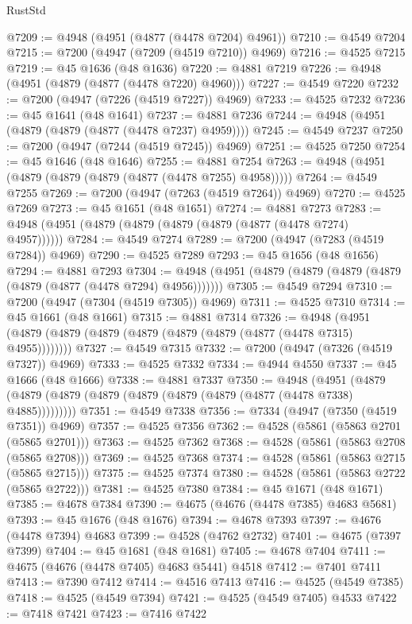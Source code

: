 \begin{lexlean}{RustStd}
\begin{coremodule}
@7209 := @4948 (@4951 (@4877 (@4478 @7204) @4961))
@7210 := @4549 @7204
@7215 := @7200 (@4947 (@7209 (@4519 @7210)) @4969)
@7216 := @4525 @7215
@7219 := @45 @1636 (@48 @1636)
@7220 := @4881 @7219
@7226 := @4948 (@4951 (@4879 (@4877 (@4478 @7220) @4960)))
@7227 := @4549 @7220
@7232 := @7200 (@4947 (@7226 (@4519 @7227)) @4969)
@7233 := @4525 @7232
@7236 := @45 @1641 (@48 @1641)
@7237 := @4881 @7236
@7244 := @4948 (@4951 (@4879 (@4879 (@4877 (@4478 @7237) @4959))))
@7245 := @4549 @7237
@7250 := @7200 (@4947 (@7244 (@4519 @7245)) @4969)
@7251 := @4525 @7250
@7254 := @45 @1646 (@48 @1646)
@7255 := @4881 @7254
@7263 := @4948 (@4951 (@4879 (@4879 (@4879 (@4877 (@4478 @7255) @4958)))))
@7264 := @4549 @7255
@7269 := @7200 (@4947 (@7263 (@4519 @7264)) @4969)
@7270 := @4525 @7269
@7273 := @45 @1651 (@48 @1651)
@7274 := @4881 @7273
@7283 := @4948 (@4951 (@4879 (@4879 (@4879 (@4879 (@4877 (@4478 @7274) @4957))))))
@7284 := @4549 @7274
@7289 := @7200 (@4947 (@7283 (@4519 @7284)) @4969)
@7290 := @4525 @7289
@7293 := @45 @1656 (@48 @1656)
@7294 := @4881 @7293
@7304 := @4948 (@4951 (@4879 (@4879 (@4879 (@4879 (@4879 (@4877 (@4478 @7294) @4956)))))))
@7305 := @4549 @7294
@7310 := @7200 (@4947 (@7304 (@4519 @7305)) @4969)
@7311 := @4525 @7310
@7314 := @45 @1661 (@48 @1661)
@7315 := @4881 @7314
@7326 := @4948 (@4951 (@4879 (@4879 (@4879 (@4879 (@4879 (@4879 (@4877 (@4478 @7315) @4955))))))))
@7327 := @4549 @7315
@7332 := @7200 (@4947 (@7326 (@4519 @7327)) @4969)
@7333 := @4525 @7332
@7334 := @4944 @4550
@7337 := @45 @1666 (@48 @1666)
@7338 := @4881 @7337
@7350 := @4948
    (@4951 (@4879 (@4879 (@4879 (@4879 (@4879 (@4879 (@4879 (@4877 (@4478 @7338) @4885)))))))))
@7351 := @4549 @7338
@7356 := @7334 (@4947 (@7350 (@4519 @7351)) @4969)
@7357 := @4525 @7356
@7362 := @4528 (@5861 (@5863 @2701 (@5865 @2701)))
@7363 := @4525 @7362
@7368 := @4528 (@5861 (@5863 @2708 (@5865 @2708)))
@7369 := @4525 @7368
@7374 := @4528 (@5861 (@5863 @2715 (@5865 @2715)))
@7375 := @4525 @7374
@7380 := @4528 (@5861 (@5863 @2722 (@5865 @2722)))
@7381 := @4525 @7380
@7384 := @45 @1671 (@48 @1671)
@7385 := @4678 @7384
@7390 := @4675 (@4676 (@4478 @7385) @4683 @5681)
@7393 := @45 @1676 (@48 @1676)
@7394 := @4678 @7393
@7397 := @4676 (@4478 @7394) @4683
@7399 := @4528 (@4762 @2732)
@7401 := @4675 (@7397 @7399)
@7404 := @45 @1681 (@48 @1681)
@7405 := @4678 @7404
@7411 := @4675 (@4676 (@4478 @7405) @4683 @5441) @4518
@7412 := @7401 @7411
@7413 := @7390 @7412
@7414 := @4516 @7413
@7416 := @4525 (@4549 @7385)
@7418 := @4525 (@4549 @7394)
@7421 := @4525 (@4549 @7405) @4533
@7422 := @7418 @7421
@7423 := @7416 @7422

\end{coremodule}
\end{lexlean}
